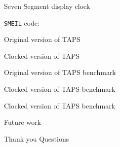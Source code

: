 \documentclass[13pt]{beamer}
\begin{document}
\begin{frame}{Seven Segment display clock}
 \begin{block}{}
  \texttt{SMEIL} code:
    \vspace{5mm}

     \scalebox{0.8}{\usebox{\smeilexamplecode}}
 \end{block}
\end{frame}

%

\begin{frame}{Original version of TAPS}
\end{frame}

\begin{frame}{Clocked version of TAPS}
\end{frame}

\begin{frame}{Original version of TAPS benchmark}
\end{frame}

\begin{frame}{Clocked version of TAPS benchmark}
\end{frame}

%
\begin{frame}{Clocked version of TAPS benchmark}
\end{frame}

%
\begin{frame}{Future work}
\end{frame}

%
\begin{frame}{Thank you}
     Questions
\end{frame}
\end{document}

